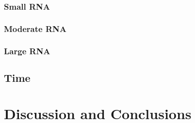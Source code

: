 \documentclass[12pt, a4paper]{article}
\begin{document}
\subsubsection{Small RNA}
\subsubsection{Moderate RNA}
\subsubsection{Large RNA}
\subsection{Time}

\section{Discussion and Conclusions}






\end{document}
